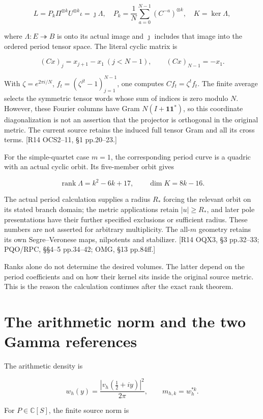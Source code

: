 \[
L=P_k\Pi^{\otimes k}U^{\otimes k}\iota=\jmath\Lambda,
\quad P_k=\frac1N\sum_{a=0}^{N-1}(C^{-a})^{\otimes k},
\quad K=\ker\Lambda,
\]

where \(\Lambda:E\twoheadrightarrow B\) is onto its actual image and \(\jmath\) includes that image into the ordered period tensor space. The literal cyclic matrix is

\[
(Cx)_j=x_{j+1}-x_1\ (j<N-1),\qquad
(Cx)_{N-1}=-x_1.
\]

With \(\zeta=e^{2\pi i/N}\), \(f_t=(\zeta^{jt}-1)_{j=1}^{N-1}\), one computes \(Cf_t=\zeta^tf_t\). The finite average selects the symmetric tensor words whose sum of indices is zero modulo \(N\). However, these Fourier columns have Gram \(N(I+\mathbf1\mathbf1^*)\), so this coordinate diagonalization is not an assertion that the projector is orthogonal in the original metric. The current source retains the induced full tensor Gram and all its cross terms. {[}R14 OCS2--11, §1 pp.20--23.{]}

For the simple-quartet case \(m=1\), the corresponding period curve is a quadric with an actual cyclic orbit. Its five-member orbit gives

\[
\operatorname{rank}\Lambda=k^2-6k+17,\qquad
\dim K=8k-16.
\]

The actual period calculation supplies a radius \(R_*\) forcing the relevant orbit on its stated branch domain; the metric applications retain \(|u|\ge R_*\), and later pole presentations have their further specified exclusions or sufficient radius. These numbers are not asserted for arbitrary multiplicity. The all-\(m\) geometry retains its own Segre--Veronese maps, nilpotents and stabilizer. {[}R14 OQX3, §3 pp.32--33; PQO/RPC, §§4--5 pp.34--42; OMG, §13 pp.84ff.{]}

Ranks alone do not determine the desired volumes. The latter depend on the period coefficients and on how their kernel sits inside the original source metric. This is the reason the calculation continues after the exact rank theorem.

\section{The arithmetic norm and the two Gamma references}\label{the-arithmetic-norm-and-the-two-gamma-references}

The arithmetic density is

\[
w_h(y)=\frac{|v_h(\tfrac12+iy)|^2}{2\pi},\qquad
m_{h,k}=w_h^{*k}.
\]

For \(P\in\mathbb C[S]\), the finite source norm is

